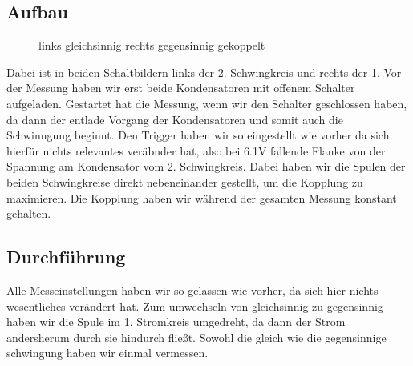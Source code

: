 \documentclass[twoside]{protokoll}
\begin{document}
\subsection{Aufbau}
\begin{figure}[H]
    \centering
    \hfill
    \caption{links gleichsinnig rechts gegensinnig gekoppelt}
\end{figure}
Dabei ist in beiden Schaltbildern links der 2. Schwingkreis und rechts der 1.
Vor der Messung haben wir erst beide Kondensatoren mit offenem Schalter aufgeladen.
Gestartet hat die Messung, wenn wir den Schalter geschlossen haben, da dann der entlade Vorgang der Kondensatoren und somit auch die Schwinngung beginnt.
Den Trigger haben wir so eingestellt wie vorher da sich hierfür nichts relevantes veräbnder hat, also bei 6.1V fallende Flanke von der Spannung am Kondensator vom 2. Schwingkreis.
Dabei haben wir die Spulen der beiden Schwingkreise direkt nebeneinander gestellt, um die Kopplung zu maximieren.
Die Kopplung haben wir während der gesamten Messung konstant gehalten.

\subsection{Durchführung}
Alle Messeinstellungen haben wir so gelassen wie vorher, da sich hier nichts wesentliches verändert hat.
Zum umwechseln von gleichsinnig zu gegensinnig haben wir die Spule im 1. Stromkreis umgedreht, da dann der Strom andersherum durch sie hindurch fließt.
Sowohl die gleich wie die gegensinnige schwingung haben wir einmal vermessen.
\end{document}
